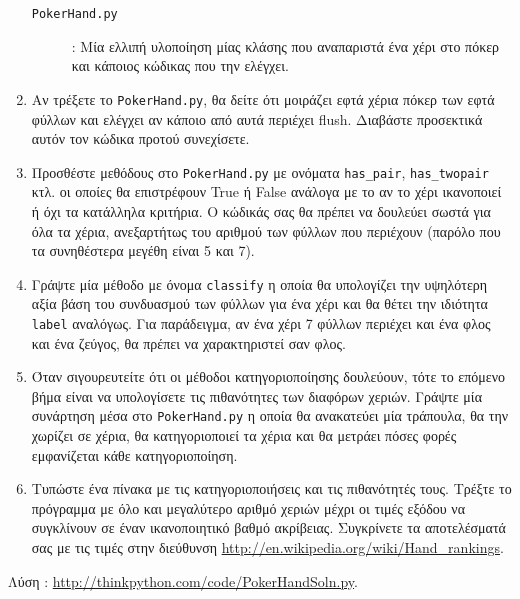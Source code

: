 \documentclass[10pt]{book}
\begin{document}
\begin{exercise}
\begin{enumerate}
\begin{description}
\item[{\tt PokerHand.py}]:  Μία ελλιπή υλοποίηση μίας κλάσης που αναπαριστά ένα χέρι 
στο πόκερ και κάποιος κώδικας που την ελέγχει. 

\end{description}
%
 
\item Αν τρέξετε το  {\tt PokerHand.py},  θα δείτε ότι μοιράζει εφτά χέρια πόκερ των 
εφτά φύλλων και ελέγχει αν κάποιο από αυτά περιέχει  flush.   Διαβάστε προσεκτικά αυτόν τον κώδικα προτού συνεχίσετε.

\item Προσθέστε μεθόδους στο  {\tt PokerHand.py}  με ονόματα  \verb"has_pair", 
\verb"has_twopair"  κτλ. οι οποίες θα επιστρέφουν  True  ή  False  ανάλογα 
με το αν το χέρι ικανοποιεί ή όχι τα κατάλληλα κριτήρια.  Ο κώδικάς σας θα πρέπει να δουλεύει σωστά για όλα τα χέρια, ανεξαρτήτως του αριθμού των φύλλων που περιέχουν (παρόλο που τα συνηθέστερα μεγέθη είναι 5 και 7).

\item Γράψτε μία μέθοδο με όνομα  {\tt classify}  η οποία θα υπολογίζει την 
υψηλότερη αξία βάση του συνδυασμού των φύλλων για ένα χέρι και θα θέτει την ιδιότητα  {\tt label}  αναλόγως.  Για παράδειγμα, αν ένα χέρι 7 φύλλων περιέχει και ένα 
φλος και ένα ζεύγος, θα πρέπει να χαρακτηριστεί σαν φλος.

\item Όταν σιγουρευτείτε ότι οι μέθοδοι κατηγοριοποίησης δουλεύουν, τότε το επόμενο βήμα 
είναι να υπολογίσετε τις πιθανότητες των διαφόρων χεριών.  Γράψτε μία συνάρτηση μέσα στο 
 {\tt PokerHand.py}  η οποία θα ανακατεύει μία τράπουλα, θα την χωρίζει σε χέρια, 
θα κατηγοριοποιεί τα χέρια και θα μετράει πόσες φορές εμφανίζεται κάθε κατηγοριοποίηση.

\item Τυπώστε ένα πίνακα με τις κατηγοριοποιήσεις και τις πιθανότητές τους.  Τρέξτε το 
πρόγραμμα με όλο και μεγαλύτερο αριθμό χεριών μέχρι οι τιμές εξόδου να συγκλίνουν σε έναν 
ικανοποιητικό βαθμό ακρίβειας.  Συγκρίνετε τα αποτελέσματά σας με τις τιμές στην διεύθυνση 
 \url{http://en.wikipedia.org/wiki/Hand_rankings}. 

\end{enumerate}

Λύση : \url{http://thinkpython.com/code/PokerHandSoln.py}. 

\end{exercise}
\end{document}
